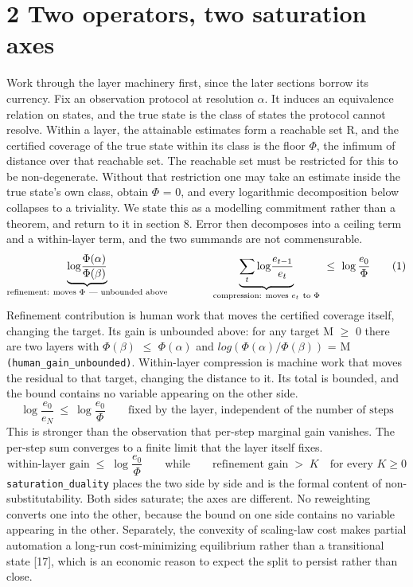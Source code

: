 \documentclass[11pt,a4paper]{article}
\theoremstyle{definition}
\theoremstyle{remark}
\begin{document}
\section*{2  Two operators, two saturation axes}
Work through the layer machinery first, since the later sections borrow its currency. Fix an observation protocol at resolution $α$. It induces an equivalence relation on states, and the true state is the class of states the protocol cannot resolve. Within a layer, the attainable estimates form a reachable set R, and the certified coverage of the true state within its class is the floor $Φ$, the infimum of distance over that reachable set.
The reachable set must be restricted for this to be non-degenerate. Without that restriction one may take an estimate inside the true state's own class, obtain $Φ$ = 0, and every logarithmic decomposition below collapses to a triviality. We state this as a modelling commitment rather than a theorem, and return to it in section 8.
Error then decomposes into a ceiling term and a within-layer term, and the two summands are not commensurable.
\begin{equation}
\underbrace{\log\!\frac{\Phi(\alpha)}{\Phi(\beta)}}_{\text{\rm refinement: moves }\Phi\ \text{--- unbounded above}}\qquad\qquad\underbrace{\sum_{t}\log\!\frac{e_{t-1}}{e_t}}_{\text{\rm compression: moves } e_t\ \text{to }\Phi}\ \leq\ \log\frac{e_0}{\Phi}
\tag{1}
\end{equation}
Refinement contribution is human work that moves the certified coverage itself, changing the target. Its gain is unbounded above: for any target M $≥$ 0 there are two layers with $Φ(β)$ $≤$ $Φ(α)$ and $log(Φ(α)/Φ(β))$ = M \texttt{(human\_\allowbreak{}gain\_\allowbreak{}unbounded)}.
Within-layer compression is machine work that moves the residual to that target, changing the distance to it. Its total is bounded, and the bound contains no variable appearing on the other side.
\begin{equation}
\log\!\frac{e_0}{e_N}\ \leq\ \log\!\frac{e_0}{\Phi}\qquad\text{fixed by the layer, independent of the number of steps}
\tag{2}
\end{equation}
This is stronger than the observation that per-step marginal gain vanishes. The per-step sum converges to a finite limit that the layer itself fixes.
\begin{equation}
\text{within-layer gain}\;\leq\;\log\!\frac{e_0}{\Phi}\qquad\text{while}\qquad\text{refinement gain}\;>\;K\quad\text{for every }K\geq 0
\tag{3}
\end{equation}
\texttt{saturation\_\allowbreak{}duality} places the two side by side and is the formal content of non-substitutability. Both sides saturate; the axes are different. No reweighting converts one into the other, because the bound on one side contains no variable appearing in the other. Separately, the convexity of scaling-law cost makes partial automation a long-run cost-minimizing equilibrium rather than a transitional state [17], which is an economic reason to expect the split to persist rather than close.
\end{document}

